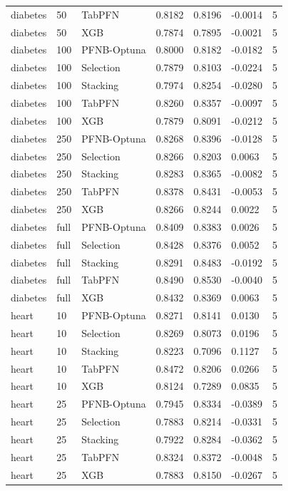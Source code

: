 \begin{tabular}{llllllr}
diabetes & 50 & TabPFN & 0.8182 & 0.8196 & -0.0014 & 5 \\
diabetes & 50 & XGB & 0.7874 & 0.7895 & -0.0021 & 5 \\
diabetes & 100 & PFNB-Optuna & 0.8000 & 0.8182 & -0.0182 & 5 \\
diabetes & 100 & Selection & 0.7879 & 0.8103 & -0.0224 & 5 \\
diabetes & 100 & Stacking & 0.7974 & 0.8254 & -0.0280 & 5 \\
diabetes & 100 & TabPFN & 0.8260 & 0.8357 & -0.0097 & 5 \\
diabetes & 100 & XGB & 0.7879 & 0.8091 & -0.0212 & 5 \\
diabetes & 250 & PFNB-Optuna & 0.8268 & 0.8396 & -0.0128 & 5 \\
diabetes & 250 & Selection & 0.8266 & 0.8203 & 0.0063 & 5 \\
diabetes & 250 & Stacking & 0.8283 & 0.8365 & -0.0082 & 5 \\
diabetes & 250 & TabPFN & 0.8378 & 0.8431 & -0.0053 & 5 \\
diabetes & 250 & XGB & 0.8266 & 0.8244 & 0.0022 & 5 \\
diabetes & full & PFNB-Optuna & 0.8409 & 0.8383 & 0.0026 & 5 \\
diabetes & full & Selection & 0.8428 & 0.8376 & 0.0052 & 5 \\
diabetes & full & Stacking & 0.8291 & 0.8483 & -0.0192 & 5 \\
diabetes & full & TabPFN & 0.8490 & 0.8530 & -0.0040 & 5 \\
diabetes & full & XGB & 0.8432 & 0.8369 & 0.0063 & 5 \\
heart & 10 & PFNB-Optuna & 0.8271 & 0.8141 & 0.0130 & 5 \\
heart & 10 & Selection & 0.8269 & 0.8073 & 0.0196 & 5 \\
heart & 10 & Stacking & 0.8223 & 0.7096 & 0.1127 & 5 \\
heart & 10 & TabPFN & 0.8472 & 0.8206 & 0.0266 & 5 \\
heart & 10 & XGB & 0.8124 & 0.7289 & 0.0835 & 5 \\
heart & 25 & PFNB-Optuna & 0.7945 & 0.8334 & -0.0389 & 5 \\
heart & 25 & Selection & 0.7883 & 0.8214 & -0.0331 & 5 \\
heart & 25 & Stacking & 0.7922 & 0.8284 & -0.0362 & 5 \\
heart & 25 & TabPFN & 0.8324 & 0.8372 & -0.0048 & 5 \\
heart & 25 & XGB & 0.7883 & 0.8150 & -0.0267 & 5 \\

\end{tabular}

